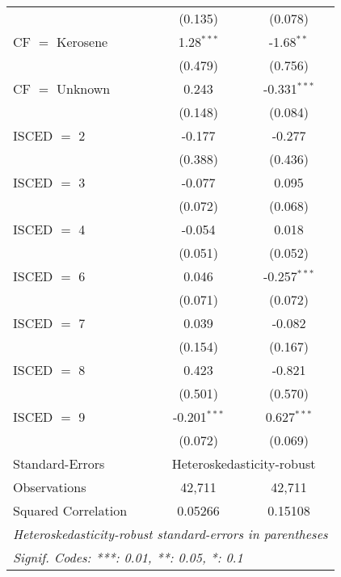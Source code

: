 \begin{table}[htbp!]
\begin{adjustbox}{width = 1\textwidth, max height = 0.95\textheight, center}
\begin{threeparttable}[b]
\begin{tabular}{lcc}
                                 & (0.135)        & (0.078)\\   
            CF $=$ Kerosene      & 1.28$^{***}$   & -1.68$^{**}$\\   
                                 & (0.479)        & (0.756)\\   
            CF $=$ Unknown       & 0.243          & -0.331$^{***}$\\   
                                 & (0.148)        & (0.084)\\   
            ISCED $=$ 2          & -0.177         & -0.277\\   
                                 & (0.388)        & (0.436)\\   
            ISCED $=$ 3          & -0.077         & 0.095\\   
                                 & (0.072)        & (0.068)\\   
            ISCED $=$ 4          & -0.054         & 0.018\\   
                                 & (0.051)        & (0.052)\\   
            ISCED $=$ 6          & 0.046          & -0.257$^{***}$\\   
                                 & (0.071)        & (0.072)\\   
            ISCED $=$ 7          & 0.039          & -0.082\\   
                                 & (0.154)        & (0.167)\\   
            ISCED $=$ 8          & 0.423          & -0.821\\   
                                 & (0.501)        & (0.570)\\   
            ISCED $=$ 9          & -0.201$^{***}$ & 0.627$^{***}$\\   
                                 & (0.072)        & (0.069)\\   
            \midrule 
            Standard-Errors & \multicolumn{2}{c}{Heteroskedasticity-robust} \\ 
            Observations         & 42,711         & 42,711\\  
            Squared Correlation  & 0.05266        & 0.15108\\  
            \midrule \midrule
            \multicolumn{3}{l}{\emph{Heteroskedasticity-robust standard-errors in parentheses}}\\
            \multicolumn{3}{l}{\emph{Signif. Codes: ***: 0.01, **: 0.05, *: 0.1}}\\
         \end{tabular}
         

\end{threeparttable}
\end{adjustbox}
\end{table}
